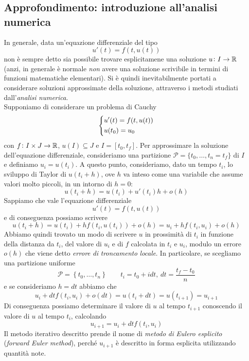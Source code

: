 \subsection{Approfondimento: introduzione all'analisi numerica}
In generale, data un'equazione differenziale del tipo
\[
u'(t) = f(t,u(t))
\]
non è sempre detto sia possibile trovare esplicitamene una soluzione $u\colon I \to \amsbb{R}$ (anzi, in generale è normale \emph{non} avere una soluzione scrivibile in termini di funzioni matematiche elementari). Si è quindi inevitabilmente portati a considerare soluzioni approssimate della soluzione, attraverso i metodi studiati dall'\emph{analisi numerica}. \\
Supponiamo di considerare un problema di Cauchy
\[
\begin{dcases}
    u'(t) = f(t,u(t))\\
    u(t_0) = u_0
\end{dcases}
\]
con $f\colon I \times J \to \amsbb{R}$, $u(I)\subseteq J$ e $I=[t_0, t_f]$. Per approssimare la soluzione dell'equazione differenziale, consideriamo una partizione $\mathscr{P} = \{t_0, \dots, t_n = t_f\}$ di $I$ e definiamo $u_i = u(t_i)$. A questo punto, consideriamo, dato un tempo $t_i$, lo sviluppo di Taylor di $u(t_i+h)$, ove $h$ va inteso come una variabile che assume valori molto piccoli, in un intorno di $h=0$:
\[
u(t_i+h) = u(t_i) + u'(t_i)h + o(h)
\]
Sappiamo che vale l'equazione differenziale
\[
u'(t) = f(t,u(t))
\]
e di conseguenza possiamo scrivere
\[
u(t_i+h) = u(t_i)+ h f(t_i, u(t_i)) +o(h) = u_i +hf(t_i, u_i)+o(h)
\]
Abbiamo quindi trovato un modo di scrivere $u$ in prossimità di $t_i$ in funzione della distanza da $t_i$, del valore di $u_i$ e di $f$ calcolata in $t_i$ e $u_i$, modulo un errore $o(h)$ che viene detto \emph{errore di troncamento locale}. In particolare, se scegliamo una partizione uniforme
\[
\mathscr{P} = \left\{t_0, \dots, t_n\right\} \qquad t_i = t_0+idt, \ dt =\frac{t_f-t_0}{n}
\]
e se consideriamo $h=dt$ abbiamo che
\[
u_i + dt f(t_i, u_i) +o(dt) = u(t_i+dt) = u(t_{i+1}) = u_{i+1}
\]
Di conseguenza possiamo determinare il valore di $u$ al tempo $t_{i+1}$ conoscendo il valore di $u$ al tempo $t_i$, calcolando
\begin{equation}
    \label{eq:12.1}
    u_{i+1} = u_i + dtf(t_i, u_i)
\end{equation}
Il metodo iterativo descritto prende il nome di \emph{metodo di Eulero esplicito} (\emph{forward Euler method}), perché $u_{i+1}$ è descritto in forma esplicita utilizzando quantità note.
